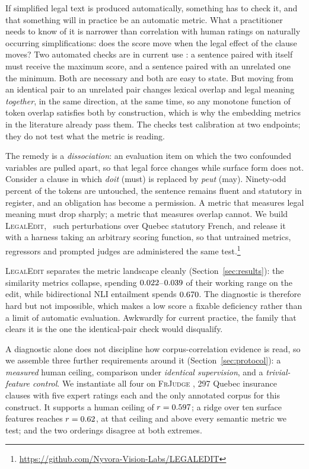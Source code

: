 \documentclass[11pt]{article}
\begin{document}
If simplified legal text is produced automatically, something has to check it,
and that something will in practice be an automatic metric. What a practitioner
needs to know of it is narrower than correlation with human ratings on naturally
occurring simplifications: does the score move when the legal effect of the
clause moves? Two automated checks are in current use
\citep{beauchemin2023meaningbert, beauchemin2025judgebert}: a sentence paired
with itself must receive the maximum score, and a sentence paired with an
unrelated one the minimum. Both are necessary and both are easy to state. But
moving from an identical pair to an unrelated pair changes lexical overlap and
legal meaning \emph{together}, in the same direction, at the same time, so any
monotone function of token overlap satisfies both by construction, which is why
the embedding metrics in the literature already pass them. The checks test
calibration at two endpoints; they do not test what the metric is reading.

The remedy is a \emph{dissociation}: an evaluation item on which the two
confounded variables are pulled apart, so that legal force changes while surface
form does not. Consider a clause in which \emph{doit} (must) is replaced by
\emph{peut} (may). Ninety-odd percent of the tokens are untouched, the sentence
remains fluent and statutory in register, and an obligation has become a
permission. A metric that measures legal meaning must drop sharply; a metric
that measures overlap cannot. We build \textsc{LegalEdit}, \numedits\ such
perturbations over Quebec statutory French, and release it with a harness taking
an arbitrary scoring function, so that untrained metrics, regressors and
prompted judges are administered the same
test.\footnote{\url{https://github.com/Nyvora-Vision-Labs/LEGALEDIT}}

\textsc{LegalEdit} separates the metric landscape cleanly
(Section~\ref{sec:results}): the similarity metrics collapse, spending
$0.022$--$0.039$ of their working range on the edit, while
bidirectional NLI entailment spends $0.670$. The diagnostic is therefore
hard but not impossible, which makes a low score a fixable deficiency rather
than a limit of automatic evaluation. Awkwardly for current practice, the family
that clears it is the one the identical-pair check would disqualify.

A diagnostic alone does not discipline how corpus-correlation evidence is read,
so we assemble three further requirements around it
(Section~\ref{sec:protocol}): a \emph{measured} human ceiling, comparison under
\emph{identical supervision}, and a \emph{trivial-feature control}. We
instantiate all four on \textsc{FrJudge} \citep{beauchemin2025judgebert}, 297
Quebec insurance clauses with five expert ratings each and the only annotated
corpus for this construct. It supports a human ceiling of $r=0.597$; a ridge
over ten surface features reaches $r=0.62$, at that ceiling and above every
semantic metric we test; and the two orderings disagree at both extremes.
\end{document}
